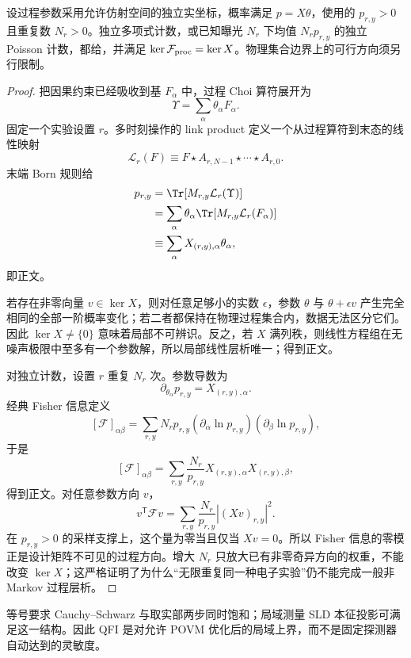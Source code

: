 \begin{proposition}
设过程参数采用允许仿射空间的独立实坐标，概率满足 $p=X\theta$，使用的 $p_{r,y}>0$ 且重复数 $N_r>0$。独立多项式计数，或已知曝光 $N_r$ 下均值 $N_rp_{r,y}$ 的独立 Poisson 计数，都给，并满足 $\ker\mathcal F_{\rm proc}=\ker X$。物理集合边界上的可行方向须另行限制。
\end{proposition}
\begin{proof}
把因果约束已经吸收到基 $F_\alpha$ 中，过程 Choi 算符展开为
\[
\Upsilon=\sum_\alpha\theta_\alpha F_\alpha.
\]
固定一个实验设置 $r$。多时刻操作的 link product 定义一个从过程算符到末态的线性映射
\[
\mathcal L_r(F)
\equiv
F\star A_{r,N-1}\star\cdots\star A_{r,0}.
\]
末端 Born 规则给
\begin{align*}
p_{r,y}
&=\Tr[M_{r,y}\mathcal L_r(\Upsilon)]\\
&=\sum_\alpha\theta_\alpha
\Tr[M_{r,y}\mathcal L_r(F_\alpha)]\\
&\equiv\sum_\alpha X_{(r,y),\alpha}\theta_\alpha,
\end{align*}
即正文。

若存在非零向量 $v\in\ker X$，则对任意足够小的实数 $\epsilon$，参数
$\theta$ 与 $\theta+\epsilon v$ 产生完全相同的全部一阶概率变化；若二者都保持在物理过程集合内，数据无法区分它们。因此 $\ker X\neq\{0\}$ 意味着局部不可辨识。反之，若 $X$ 满列秩，则线性方程组在无噪声极限中至多有一个参数解，所以局部线性层析唯一；得到正文。

对独立计数，设置 $r$ 重复 $N_r$ 次。参数导数为
\[
\partial_{\theta_\alpha}p_{r,y}=X_{(r,y),\alpha}.
\]
经典 Fisher 信息定义
\[
[\mathcal F]_{\alpha\beta}
=\sum_{r,y}N_r p_{r,y}
(\partial_\alpha\ln p_{r,y})
(\partial_\beta\ln p_{r,y}),
\]
于是
\[
[\mathcal F]_{\alpha\beta}
=\sum_{r,y}
\frac{N_r}{p_{r,y}}
X_{(r,y),\alpha}X_{(r,y),\beta},
\]
得到正文。对任意参数方向 $v$，
\[
v^{\mathsf T}\mathcal Fv
=\sum_{r,y}\frac{N_r}{p_{r,y}}
|(Xv)_{r,y}|^2.
\]
在 $p_{r,y}>0$ 的采样支撑上，这个量为零当且仅当 $Xv=0$。所以 Fisher 信息的零模正是设计矩阵不可见的过程方向。增大 $N_r$ 只放大已有非零奇异方向的权重，不能改变 $\ker X$；这严格证明了为什么“无限重复同一种电子实验”仍不能完成一般非 Markov 过程层析。
\end{proof}


等号要求 Cauchy--Schwarz 与取实部两步同时饱和；局域测量 SLD 本征投影可满足这一结构。因此 QFI 是对允许 POVM 优化后的局域上界，而不是固定探测器自动达到的灵敏度。


